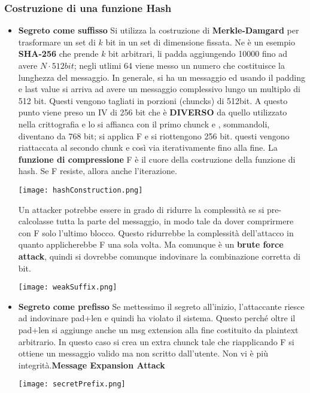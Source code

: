 \documentclass{article}
\theoremstyle{remark}
\begin{document}
\subsubsection{Costruzione di una funzione Hash}
\begin{itemize}
    \item \textbf{Segreto come suffisso} Si utilizza la costruzione di \textbf{Merkle-Damgard} per trasformare un set di $k$ bit in un set di dimensione fissata. Ne è un esempio \textbf{SHA-256} che prende $k$ bit arbitrari, li padda aggiungendo 10000 fino ad avere $N\cdot512bit$; negli utlimi 64 viene messo un numero che costituisce la lunghezza del messaggio.\newline
    In generale, si ha un messaggio ed usando il padding e last value si arriva ad avere un messaggio complessivo lungo un multiplo di 512 bit. Questi vengono tagliati in porzioni (chuncks) di 512bit. A questo punto viene preso un IV di 256 bit che è \textbf{DIVERSO} da quello utilizzato nella crittografia e lo si affianca con il primo chunck e , sommandoli, diventano da 768 bit; si applica F e si riottengono 256 bit. questi vengono riattaccata al secondo chunk e così via iterativamente fino alla fine. La \textbf{funzione di compressione} F è il cuore della costruzione della funzione di hash. Se F resiste, allora anche l'iterazione.
    \begin{center}
        \texttt{[image: hashConstruction.png]}
    \end{center}
    Un attacker potrebbe essere in grado di ridurre la complessità se si pre-calcolasse tutta la parte del messaggio, in modo tale da dover comprirmere con F solo l'ultimo blocco. Questo ridurrebbe la complessità dell'attacco in quanto applicherebbe F una sola volta. Ma comunque è un \textbf{brute force attack}, quindi si dovrebbe comunque indovinare la combinazione corretta di bit.
    \begin{center}
        \texttt{[image: weakSuffix.png]}
    \end{center}
    \item \textbf{Segreto come prefisso} Se mettessimo il segreto all'inizio, l'attaccante riesce ad indovinare pad+len e quindi ha violato il sistema. Questo perché oltre il pad+len si aggiunge anche un msg extension alla fine costituito da plaintext arbitrario. In questo caso si crea un extra chunck tale che riapplicando F si ottiene un messaggio valido ma non scritto dall'utente. Non vi è più integrità.\textbf{Message Expansion Attack}
    \begin{center}
        \texttt{[image: secretPrefix.png]}
    \end{center}
\end{itemize}
\end{document}
